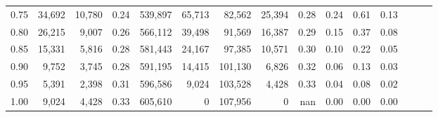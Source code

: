 \begin{tabular}{rrrrrrrrrrrrrrr}
0.75 &  34,692 &  10,780 &  0.24 &  539,897 &   65,713 &   82,562 &   25,394 &  0.28 &  0.24 &  0.61 &      0.13 \\
0.80 &  26,215 &   9,007 &  0.26 &  566,112 &   39,498 &   91,569 &   16,387 &  0.29 &  0.15 &  0.37 &      0.08 \\
0.85 &  15,331 &   5,816 &  0.28 &  581,443 &   24,167 &   97,385 &   10,571 &  0.30 &  0.10 &  0.22 &      0.05 \\
0.90 &   9,752 &   3,745 &  0.28 &  591,195 &   14,415 &  101,130 &    6,826 &  0.32 &  0.06 &  0.13 &      0.03 \\
0.95 &   5,391 &   2,398 &  0.31 &  596,586 &    9,024 &  103,528 &    4,428 &  0.33 &  0.04 &  0.08 &      0.02 \\
1.00 &   9,024 &   4,428 &  0.33 &  605,610 &        0 &  107,956 &        0 &   nan &  0.00 &  0.00 &      0.00 \\
\bottomrule
\end{tabular}
